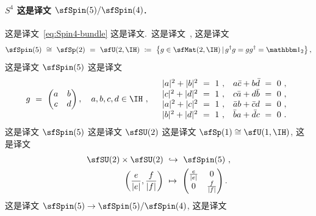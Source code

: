 \documentclass[
    affil-it, %
    auth-lg, %
    british, %
    compression, %
    contents, %
    custom-packages={}, %
    references={bigone}, %
]{lib/preprint}
\begin{document}
\begin{body}
        \paragraph{$S^4$ 这是译文 $\sfSpin(5)/\sfSpin(4)$.}
 这是译文~\eqref{eq:Spin4-bundle} 这是译文.~这是译文~\cite[Diagram 24.4]{Porteous:1995eh}, 这是译文 
        \begin{equation}\label{eq:def_Sp2}
            \sfSpin(5)\ \cong\ \sfSp(2)\ =\ \sfU(2,\IH)\ \coloneqq\ \left\{g\in\sfMat(2,\IH)\,|\,g^\dagger g=gg^\dagger=\unit_2\right\},
        \end{equation}  这是译文 $\sfSpin(5)$ 这是译文         \begin{equation}\label{eq:Spin5-elements}
            g\ =\ \begin{pmatrix}
                a & b
                \\
                c & d
            \end{pmatrix},
            \quad
            a,b,c,d\in\IH~,
            \quad
            \begin{array}{ll}
                |a|^2+|b|^2\ =\ 1~,&a\bar c+b\bar d\ =\ 0~,
                \\
                |c|^2+|d|^2\ =\ 1~,&c\bar a+d\bar b\ =\ 0~,
                \\
                |a|^2+|c|^2\ =\ 1~,&\bar a b+\bar c d\ =\ 0~,
                \\
                |b|^2+|d|^2\ =\ 1~,&\bar b a+\bar d c\ =\ 0~.
            \end{array}
        \end{equation}  这是译文 $\sfSpin(5)$ 这是译文 $\sfSU(2)$ 这是译文 $\sfSp(1)\cong\sfU(1,\IH)$, 这是译文         \begin{equation}
            \begin{aligned}
                \sfSU(2)\times\sfSU(2)\ &\hookrightarrow\ \sfSpin(5)~,
                \\
                \left(\frac{e}{|e|},\frac{f}{|f|}\right)\ &\mapsto\ 
                \begin{pmatrix}
                    \frac{e}{|e|} & 0 
                    \\
                    0 & \frac{f}{|f|}
                \end{pmatrix}.
            \end{aligned}
        \end{equation}  这是译文 $\sfSpin(5)\rightarrow\sfSpin(5)/\sfSpin(4)$, 这是译文         \begin{equation}\label{eq:Spin4Action}

\end{equation}
\end{body}
\end{document}

